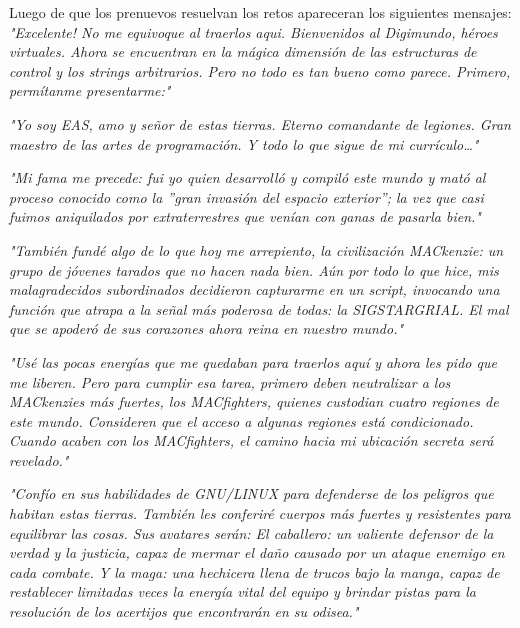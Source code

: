 \documentclass[a4paper,10pt]{article}
\begin{document}
	Luego de que los prenuevos resuelvan los retos apareceran los siguientes mensajes:\\
	
	\hspace{-1cm}\textit{"Excelente! No me equivoque al traerlos aqui. Bienvenidos al Digimundo, héroes virtuales. Ahora se encuentran en la mágica dimensión de las estructuras de control y los strings arbitrarios. Pero no todo es tan bueno como parece. Primero, permítanme presentarme:"\\}
	
	\hspace{-1cm}\textit{"Yo soy EAS, amo y señor de estas tierras. Eterno comandante de legiones. Gran maestro de las artes de programación. Y todo lo que sigue de mi currículo…"\\}
	
	\hspace{-1cm}\textit{"Mi fama me precede: fui yo quien desarrolló y compiló este mundo y mató al proceso conocido como la ”gran invasión del espacio exterior”; la vez que casi fuimos aniquilados por extraterrestres que venían con ganas de pasarla bien."\\}
	
	\hspace{-1cm}\textit{"También fundé algo de lo que hoy me arrepiento, la civilización MACkenzie: un grupo de jóvenes tarados que no hacen nada bien. Aún por todo lo que hice, mis malagradecidos subordinados decidieron capturarme en un script, invocando una función que atrapa a la señal más poderosa de todas: la SIGSTARGRIAL. El mal que se apoderó de sus corazones ahora reina en nuestro mundo."\\}
	
	\hspace{-1cm}\textit{"Usé las pocas energías que me quedaban para traerlos aquí y ahora les pido que me liberen. Pero para cumplir esa tarea, primero deben neutralizar a los MACkenzies más fuertes, los MACfighters, quienes custodian cuatro regiones de este mundo. Consideren que el acceso a algunas regiones está condicionado. Cuando acaben con los MACfighters, el camino hacia mi ubicación secreta será revelado."\\}
	
	\hspace{-1cm}\textit{"Confío en sus habilidades de GNU/LINUX para defenderse de los peligros que habitan estas tierras. También les conferiré cuerpos más fuertes y resistentes para equilibrar las cosas. Sus avatares serán: El caballero: un valiente defensor de la verdad y la justicia, capaz de mermar el daño causado por un ataque enemigo en cada combate. Y la maga: una hechicera llena de trucos bajo la manga, capaz de restablecer limitadas veces la energía vital del equipo y brindar pistas para la resolución de los acertijos que encontrarán en su odisea."\\}
	
\end{document}
